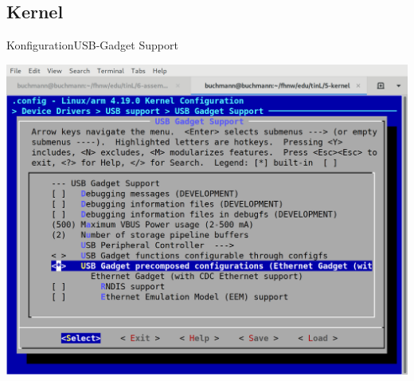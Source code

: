 \subsection{Kernel}

\begin{frame}{Konfiguration}{USB-Gadget Support}
\begin{center}
\includegraphics[height=0.75\textheight]{usb-gadget-support.png}
\end{center}
\end{frame}
